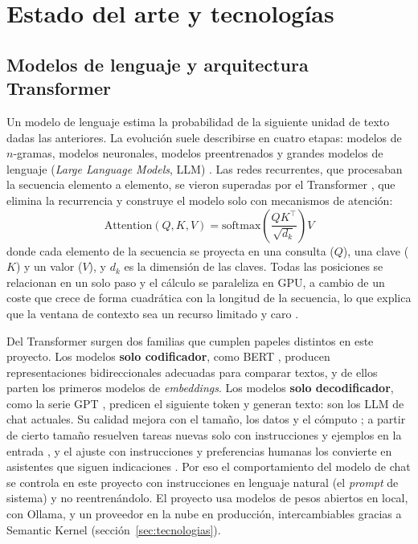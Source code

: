 \chapter{Estado del arte y tecnologías}
\label{cap:estado-arte}

\section{Modelos de lenguaje y arquitectura Transformer}
\label{sec:llm}

Un modelo de lenguaje estima la probabilidad de la siguiente unidad de texto dadas las anteriores. La evolución suele describirse en cuatro etapas: modelos de $n$-gramas, modelos neuronales, modelos preentrenados y grandes modelos de lenguaje (\emph{Large Language Models}, LLM) \cite{zhao2023survey}. Las redes recurrentes, que procesaban la secuencia elemento a elemento, se vieron superadas por el Transformer \cite{vaswani2017}, que elimina la recurrencia y construye el modelo solo con mecanismos de atención:
\begin{equation}
  \mathrm{Attention}(Q, K, V) = \mathrm{softmax}\!\left(\frac{QK^{\top}}{\sqrt{d_k}}\right) V
  \label{eq:atencion}
\end{equation}
donde cada elemento de la secuencia se proyecta en una consulta ($Q$), una clave ($K$) y un valor ($V$), y $d_k$ es la dimensión de las claves. Todas las posiciones se relacionan en un solo paso y el cálculo se paraleliza en GPU, a cambio de un coste que crece de forma cuadrática con la longitud de la secuencia, lo que explica que la ventana de contexto sea un recurso limitado y caro \cite{vaswani2017}.

Del Transformer surgen dos familias que cumplen papeles distintos en este proyecto. Los modelos \textbf{solo codificador}, como BERT \cite{devlin2019}, producen representaciones bidireccionales adecuadas para comparar textos, y de ellos parten los primeros modelos de \emph{embeddings}. Los modelos \textbf{solo decodificador}, como la serie GPT \cite{radford2018}, predicen el siguiente token y generan texto: son los LLM de chat actuales. Su calidad mejora con el tamaño, los datos y el cómputo \cite{kaplan2020,hoffmann2022}; a partir de cierto tamaño resuelven tareas nuevas solo con instrucciones y ejemplos en la entrada \cite{brown2020}, y el ajuste con instrucciones y preferencias humanas los convierte en asistentes que siguen indicaciones \cite{ouyang2022}. Por eso el comportamiento del modelo de chat se controla en este proyecto con instrucciones en lenguaje natural (el \emph{prompt} de sistema) y no reentrenándolo. El proyecto usa modelos de pesos abiertos en local, con Ollama, y un proveedor en la nube en producción, intercambiables gracias a Semantic Kernel (sección~\ref{sec:tecnologias}).

